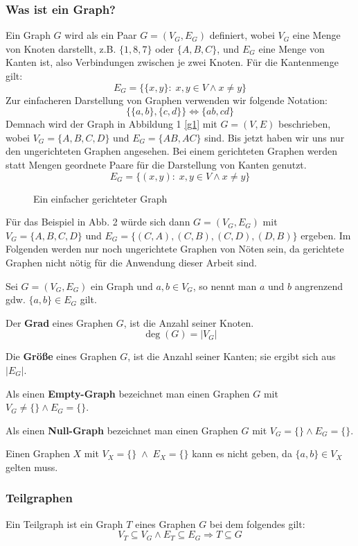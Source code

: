 \subsubsection{Was ist ein Graph?}
Ein Graph $G$ wird als ein Paar $G=(V_G,E_G)$ definiert, wobei \(V_G\) eine Menge von Knoten darstellt, z.B. \(\{1, 8, 7\}\) oder \(\{A, B, C\}\), und \(E_G\) eine Menge von Kanten ist, also Verbindungen zwischen je zwei Knoten. Für die Kantenmenge gilt:
$$E_G = \{\{x, y\} \colon \; x,y \in V \wedge x \neq y \}$$
Zur einfacheren Darstellung von Graphen verwenden wir folgende Notation:
$$\{\{a, b\}, \{c, d\}\} \Leftrightarrow \{ab, cd\}$$
Demnach wird der Graph in Abbildung 1 \ref{g1} mit \(G=(V,E)\) beschrieben, wobei \(V_G=\{A,B,C,D\}\) und \(E_G=\{AB,AC\}\) sind. 
\newpage
Bis jetzt haben wir uns nur den ungerichteten Graphen angesehen. Bei einem gerichteten Graphen werden statt Mengen geordnete Paare für die Darstellung von Kanten genutzt. 
$$E_G = \{(x, y) \colon \; x,y \in V \wedge x \neq y \}$$
\begin{figure}[h]
    \centering
    
    \caption{Ein einfacher gerichteter Graph}
\end{figure}
Für das Beispiel in Abb. 2 würde sich dann $G=(V_G, E_G)$ mit $V_G=\{A,B,C,D\}$ und $E_G=\{(C,A), (C,B), (C,D), (D,B)\}$ ergeben. Im Folgenden werden nur noch ungerichtete Graphen von Nöten sein, da gerichtete Graphen nicht nötig für die Anwendung dieser Arbeit sind. 
\begin{definition}
    Sei $G=(V_G, E_G)$ ein Graph und $a, b \in V_G$, so nennt man $a$ und $b$ angrenzend gdw. $\{a,b\} \in E_G$ gilt.
\end{definition}
\begin{definition}
    Der \textbf{Grad} eines Graphen $G$, ist die Anzahl seiner Knoten. 
    $$\deg(G)=|V_G|$$
\end{definition}
\begin{definition}
    Die \textbf{Größe} eines Graphen $G$, ist die Anzahl seiner Kanten; sie ergibt sich aus $|E_G|$.
\end{definition}
\begin{definition}
    Als einen \textbf{Empty-Graph} bezeichnet man einen Graphen $G$ mit $V_G \neq \{\} \wedge E_G=\{\}$.\\
\end{definition}
\begin{definition}
     Als einen \textbf{Null-Graph} bezeichnet man einen Graphen $G$ mit $V_G=\{\} \wedge E_G=\{\}$.
\end{definition}
Einen Graphen $X$ mit $V_X = \{\} \; \wedge \; E_X =\{\}$ kann es nicht geben, da $\{a,b\} \in V_X$ gelten muss.
\newpage
\subsubsection{Teilgraphen}
Ein Teilgraph ist ein Graph $T$ eines Graphen $G$ bei dem folgendes gilt:
$$V_T \subseteq V_G \wedge E_T \subseteq E_G \Rightarrow T \subseteq G$$